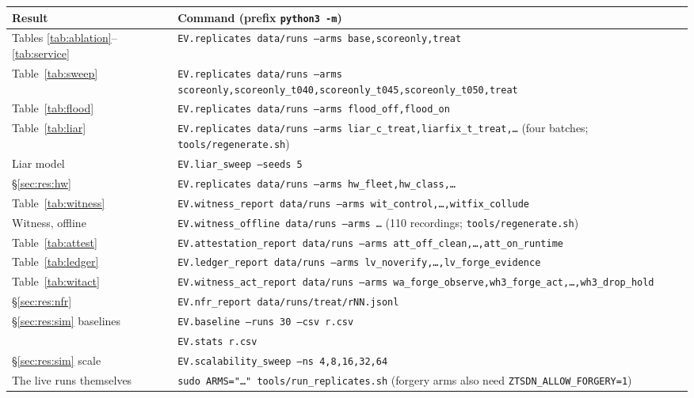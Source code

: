 \documentclass[10pt,twocolumn,letterpaper]{article}
\begin{document}
\begin{table}[H]
\centering\footnotesize
\begin{tabularx}{\columnwidth}{@{}lX@{}}
\toprule
\textbf{Result} & \textbf{Command} (prefix \texttt{python3 -m})\\
\midrule
Tables \ref{tab:ablation}--\ref{tab:service} & \texttt{EV.replicates data/runs --arms base,\allowbreak scoreonly,\allowbreak treat}\\
Table~\ref{tab:sweep} & \texttt{EV.replicates data/runs --arms scoreonly,\allowbreak scoreonly\_t040,\allowbreak scoreonly\_t045,\allowbreak scoreonly\_t050,\allowbreak treat}\\
Table~\ref{tab:flood} & \texttt{EV.replicates data/runs --arms flood\_off,flood\_on}\\
Table~\ref{tab:liar} & \texttt{EV.replicates data/runs --arms liar\_c\_treat,\allowbreak liarfix\_t\_treat,\allowbreak \ldots} (four batches; \texttt{tools/regenerate.sh})\\
Liar model & \texttt{EV.liar\_sweep --seeds 5}\\
\S\ref{sec:res:hw} & \texttt{EV.replicates data/runs --arms hw\_fleet,\allowbreak hw\_class,\allowbreak \ldots}\\
Table~\ref{tab:witness} & \texttt{EV.witness\_report data/runs --arms wit\_control,\allowbreak \ldots,\allowbreak witfix\_collude}\\
Witness, offline & \texttt{EV.witness\_offline data/runs --arms \ldots} (110 recordings; \texttt{tools/regenerate.sh})\\
Table~\ref{tab:attest} & \texttt{EV.attestation\_report data/runs --arms att\_off\_clean,\allowbreak \ldots,\allowbreak att\_on\_runtime}\\
Table~\ref{tab:ledger} & \texttt{EV.ledger\_report data/runs --arms lv\_noverify,\allowbreak \ldots,\allowbreak lv\_forge\_evidence}\\
Table~\ref{tab:witact} & \texttt{EV.witness\_act\_report data/runs --arms wa\_forge\_observe,\allowbreak wh3\_forge\_act,\allowbreak \ldots,\allowbreak wh3\_drop\_hold}\\
\S\ref{sec:res:nfr} & \texttt{EV.nfr\_report data/runs/treat/rNN.jsonl}\\
\S\ref{sec:res:sim} baselines & \texttt{EV.baseline --runs 30 --csv r.csv}\\
 & \texttt{EV.stats r.csv}\\
\S\ref{sec:res:sim} scale & \texttt{EV.scalability\_sweep --ns 4,8,16,32,64}\\
The live runs themselves & \texttt{sudo ARMS="\ldots" tools/run\_replicates.sh} (forgery arms also need \texttt{ZTSDN\_ALLOW\_FORGERY=1})\\
\bottomrule
\end{tabularx}
\end{table}
\end{document}
